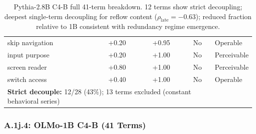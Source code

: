 \documentclass[10pt]{article} %
\begin{document}
\begin{table}[H]
\begin{tabular}{|l|c|c|c|l|}
skip navigation & +0.20 & +0.95 & No & Operable \\
input purpose & +0.20 & +1.00 & No & Perceivable \\
screen reader & +0.80 & +1.00 & No & Perceivable \\
switch access & +0.40 & +1.00 & No & Operable \\
\hline
\multicolumn{4}{|l|}{\textbf{Strict decouple:} 12/28 (43\%); 13 terms excluded (constant behavioral series)} \\
\hline
\end{tabular}
\caption{Pythia-2.8B C4-B full 41-term breakdown. 12 terms show strict decoupling; deepest single-term decoupling for reflow content ($\rho_\text{late}=-0.63$); reduced fraction relative to 1B consistent with redundancy regime emergence.}
\end{table}

\subsubsection*{A.1j.4: OLMo-1B C4-B (41 Terms)}
\end{document}
